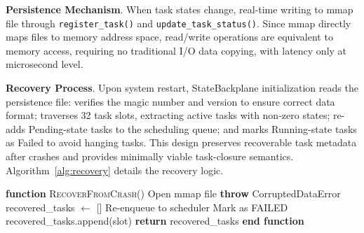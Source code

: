 \textbf{Persistence Mechanism}. When task states change, real-time writing to mmap file through \texttt{register\_task()} and \texttt{update\_task\_status()}. Since mmap directly maps files to memory address space, read/write operations are equivalent to memory access, requiring no traditional I/O data copying, with latency only at microsecond level.

\textbf{Recovery Process}. Upon system restart, StateBackplane initialization reads the persistence file: verifies the magic number and version to ensure correct data format; traverses 32 task slots, extracting active tasks with non-zero states; re-adds Pending-state tasks to the scheduling queue; and marks Running-state tasks as Failed to avoid hanging tasks. This design preserves recoverable task metadata after crashes and provides minimally viable task-closure semantics. Algorithm~\ref{alg:recovery} details the recovery logic.

\begin{algorithm}[!t]
\caption{Crash Recovery Process}
\label{alg:recovery}
\begin{algorithmic}[1]
\STATE \textbf{function} \textsc{RecoverFromCrash}()
\STATE Open mmap file
    \STATE \textbf{throw} CorruptedDataError
\ENDIF
\STATE recovered\_tasks $\leftarrow$ []
            \STATE Re-enqueue to scheduler
            \STATE Mark as FAILED
        \ENDIF
        \STATE recovered\_tasks.append(slot)
    \ENDIF
\ENDFOR
\STATE \textbf{return} recovered\_tasks
\STATE \textbf{end function}
\end{algorithmic}
\end{algorithm}
